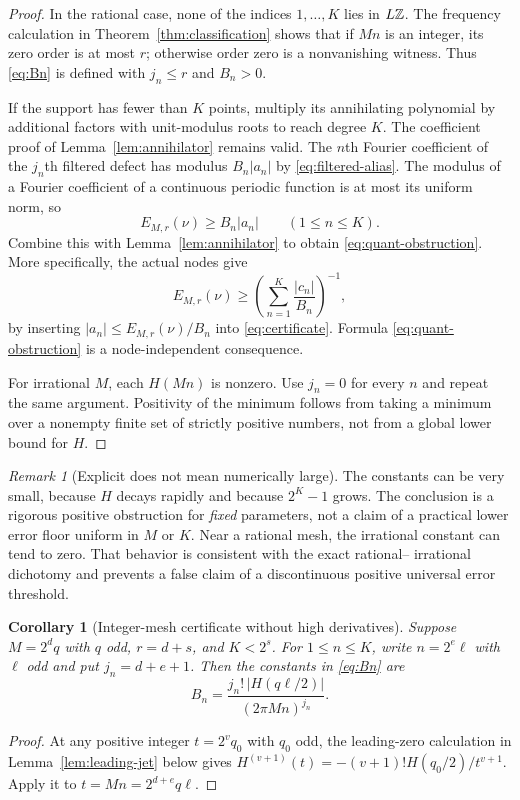 \documentclass[11pt,a4paper]{article}
\numberwithin{equation}{section}
\newtheorem{corollary}[theorem]{Corollary}
\theoremstyle{definition}
\theoremstyle{remark}
\newtheorem{remark}[theorem]{Remark}
\begin{document}
\begin{proof}
In the rational case, none of the indices $1,\ldots,K$ lies in $L\mathbb Z$.
The frequency calculation in Theorem~\ref{thm:classification} shows that
if $Mn$ is an integer, its zero order is at most $r$; otherwise order
zero is a nonvanishing witness. Thus \eqref{eq:Bn} is defined with
$j_n\le r$ and $B_n>0$.

If the support has fewer than $K$ points, multiply its annihilating
polynomial by additional factors with unit-modulus roots to reach degree
$K$. The coefficient proof of Lemma~\ref{lem:annihilator} remains valid.
The $n$th Fourier coefficient of the $j_n$th filtered defect has modulus
$B_n|a_n|$ by \eqref{eq:filtered-alias}. The modulus of a Fourier
coefficient of a continuous periodic function is at most its uniform
norm, so
\[
 E_{M,r}(\nu)\ge B_n|a_n|\qquad(1\le n\le K).
\]
Combine this with Lemma~\ref{lem:annihilator} to obtain
\eqref{eq:quant-obstruction}. More specifically, the actual nodes give
\begin{equation}
 E_{M,r}(\nu)\ge
 \left(\sum_{n=1}^K\frac{|c_n|}{B_n}\right)^{-1},
 \label{eq:node-dependent-bound}
\end{equation}
by inserting $|a_n|\le E_{M,r}(\nu)/B_n$ into
\eqref{eq:certificate}. Formula \eqref{eq:quant-obstruction} is a
node-independent consequence.

For irrational $M$, each $H(Mn)$ is nonzero. Use $j_n=0$ for every
$n$ and repeat the same argument. Positivity of the minimum follows
from taking a minimum over a nonempty finite set of strictly positive
numbers, not from a global lower bound for $H$.
\end{proof}

\begin{remark}[Explicit does not mean numerically large]
The constants can be very small, because $H$ decays rapidly and because
$2^K-1$ grows. The conclusion is a rigorous positive obstruction for
\emph{fixed} parameters, not a claim of a practical lower error floor
uniform in $M$ or $K$. Near a rational mesh, the irrational constant can
tend to zero. That behavior is consistent with the exact rational--
irrational dichotomy and prevents a false claim of a discontinuous
positive universal error threshold.
\end{remark}

\begin{corollary}[Integer-mesh certificate without high derivatives]
\label{cor:integer-B}
Suppose $M=2^dq$ with $q$ odd, $r=d+s$, and $K<2^s$.
For $1\le n\le K$, write $n=2^e\ell$ with $\ell$ odd and put
$j_n=d+e+1$. Then the constants in \eqref{eq:Bn} are
\begin{equation}
 B_n=\frac{j_n!\,|H(q\ell/2)|}{(2\pi Mn)^{j_n}}.
 \label{eq:explicit-B}
\end{equation}
\end{corollary}
\begin{proof}
At any positive integer $t=2^vq_0$ with $q_0$ odd, the leading-zero
calculation in Lemma~\ref{lem:leading-jet} below gives
$H^{(v+1)}(t)=-(v+1)!H(q_0/2)/t^{v+1}$.
Apply it to $t=Mn=2^{d+e}q\ell$.
\end{proof}
\end{document}
